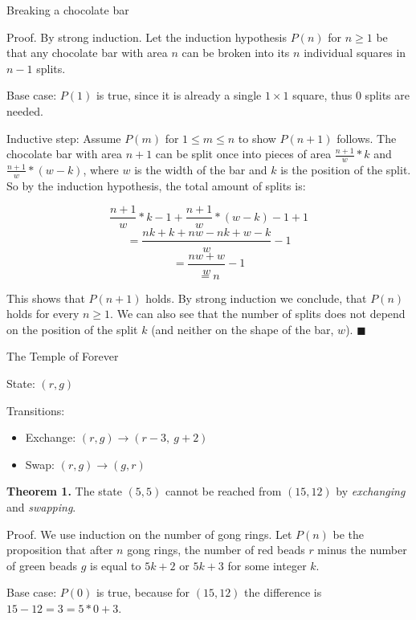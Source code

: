 \documentclass[../main.tex]{subfiles}
\begin{document}
\begin{questions}

  \question Breaking a chocolate bar
  \begin{solution}
    Proof. By strong induction. Let the induction hypothesis $P(n)$ for $n \ge 1$ be that any chocolate bar with area $n$ can be broken into its $n$ individual squares in $n-1$ splits.

    Base case: $P(1)$ is true, since it is already a single $1 \times 1$ square, thus 0 splits are needed.

    Inductive step: Assume $P(m)$ for $1 \le m \le n$ to show $P(n+1)$ follows. The chocolate bar with area $n+1$ can be split once into pieces of area $\frac{n+1}{w}*k$ and $\frac{n+1}{w}*(w-k)$, where $w$ is the width of the bar and $k$ is the position of the split. So by the induction hypothesis, the total amount of splits is:

    $$
    \frac{n+1}{w}*k-1 + \frac{n+1}{w}*(w-k)-1 + 1
    $$
    $$
    = \frac{nk+k+nw-nk+w-k}{w} - 1
    $$
    $$
    = \frac{nw+w}{w} - 1
    $$
    $$
    = n
    $$

    This shows that $P(n+1)$ holds. By strong induction we conclude, that $P(n)$ holds for every $n \ge 1$. We can also see that the number of splits does not depend on the position of the split $k$ (and neither on the shape of the bar, $w$). $\blacksquare$
  \end{solution}

  \question The Temple of Forever
  \begin{solution}

    State: $(r, g)$

    Transitions:
    \begin{itemize}
      \item Exchange: $(r, g) \rightarrow (r-3,\ g+2)$
      \item Swap: $(r, g) \rightarrow (g, r)$
    \end{itemize}

    \textbf{Theorem 1.} The state $(5, 5)$ cannot be reached from $(15, 12)$ by \textit{exchanging} and \textit{swapping}.

    Proof. We use induction on the number of gong rings. Let $P(n)$ be the proposition that after $n$ gong rings, the number of red beads $r$ minus the number of green beads $g$ is equal to $5k + 2$ or $5k + 3$ for some integer $k$.

    Base case: $P(0)$ is true, because for $(15, 12)$ the difference is $15-12 = 3 = 5*0+3$.


\end{solution}
\end{questions}
\end{document}

